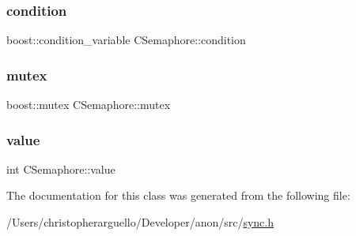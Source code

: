 \subsubsection{\texorpdfstring{condition}{condition}}
{\footnotesize\ttfamily boost\+::condition\+\_\+variable C\+Semaphore\+::condition\hspace{0.3cm}{\ttfamily [private]}}

\mbox{\label{class_c_semaphore_ac871c4228d6a9b7f67f340ba693a629d}} 
\subsubsection{\texorpdfstring{mutex}{mutex}}
{\footnotesize\ttfamily boost\+::mutex C\+Semaphore\+::mutex\hspace{0.3cm}{\ttfamily [private]}}

\mbox{\label{class_c_semaphore_a22a51512b911d93b37411cfffc764303}} 
\subsubsection{\texorpdfstring{value}{value}}
{\footnotesize\ttfamily int C\+Semaphore\+::value\hspace{0.3cm}{\ttfamily [private]}}



The documentation for this class was generated from the following file\+:\begin{DoxyCompactItemize}
\item 
/\+Users/christopherarguello/\+Developer/anon/src/\mbox{\hyperlink{sync_8h}{sync.\+h}}\end{DoxyCompactItemize}
